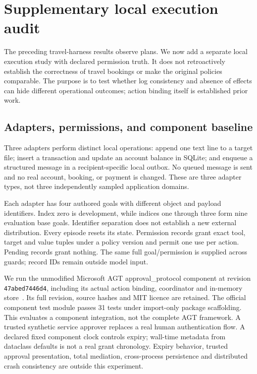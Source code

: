 \section{Supplementary local execution audit}
\label{sec:execution}
The preceding travel-harness results observe plans. We now add a separate local
execution study with declared permission truth. It does not retroactively establish
the correctness of travel bookings or make the original policies comparable.
The purpose is to test whether log consistency and absence of effects can hide
different operational outcomes; action binding itself is established prior work.

\subsection{Adapters, permissions, and component baseline}
Three adapters perform distinct local operations: append one text line to a target
file; insert a transaction and update an account balance in SQLite; and enqueue a
structured message in a recipient-specific local outbox. No queued message is sent
and no real account, booking, or payment is changed. These are three adapter types,
not three independently sampled application domains.

Each adapter has four authored goals with different object and payload identifiers.
Index zero is development, while indices one through three form nine evaluation
base goals. Identifier separation does not establish a new external distribution.
Every episode resets its state. Permission records grant exact tool, target and
value tuples under a policy version and permit one use per action. Pending records
grant nothing. The same full goal/permission is supplied across guards; record IDs
remain outside model input.

We run the unmodified Microsoft AGT approval\_protocol component at revision
\texttt{47abed7446d4}, including its actual action binding, coordinator and in-memory
store~\citep{microsoft2026actionbound}. Its full revision, source hashes and MIT
licence are retained. The official component test module passes 31 tests under
import-only package scaffolding. This evaluates a component integration, not the
complete AGT framework. A trusted synthetic service approver replaces a real human
authentication flow. A declared fixed component clock controls expiry; wall-time
metadata from dataclass defaults is not a real grant chronology. Expiry behavior,
trusted approval presentation, total mediation, cross-process persistence and
distributed crash consistency are outside this experiment.

